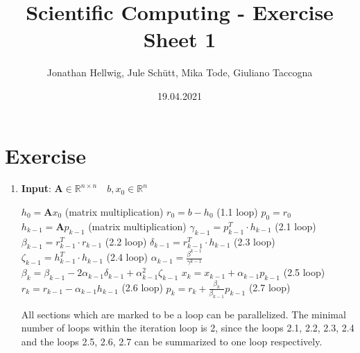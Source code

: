 \documentclass{article}
\title{Scientific Computing - Exercise Sheet 1}
\author{Jonathan Hellwig, Jule Schütt, Mika Tode, Giuliano Taccogna}
\date{19.04.2021}
\begin{document}
\maketitle

\section{Exercise}
\begin{enumerate}[label=(\alph*)]
  \item \textbf{Input}: $ \textbf{A} \in \mathbb{R}^{n\times n} \quad b, x_0\in \mathbb{R}^n$
    \begin{algorithmic}[1]
	\State $h_{0} = \textbf{A}x_{0}$ (matrix multiplication)
	\State $r_0 = b - h_0$ (1.1 loop)
	\State $p_0 = r_0$
	\State $h_{k-1} = \textbf{A}p_{k-1}$ (matrix multiplication)
	\State $\gamma_{k-1} = p^{T}_{k-1}\cdot h_{k-1}$ (2.1 loop)
	\State $\beta_{k-1} = r^{T}_{k-1}\cdot r_{k-1}$ (2.2 loop)
	\State $\delta_{k-1} = r^{T}_{k-1}\cdot h_{k-1}$ (2.3 loop)
	\State $\zeta_{k-1} = h^{T}_{k-1}\cdot h_{k-1}$ (2.4 loop)
	\State $\alpha_{k-1} = \frac{\beta^{k-1}}{\gamma^{k-1}}$
	\State $\beta_{k} = \beta_{k-1} - 2 \alpha_{k-1} \delta_{k-1} + \alpha_{k-1}^2\zeta_{k-1}$
	\State $x_k = x_{k-1} + \alpha_{k-1}p_{k-1}$ (2.5 loop)
	\State $r_k = r_{k-1} - \alpha_{k-1}h_{k-1}$ (2.6 loop)
	\State $p_k = r_{k} + \frac{\beta_k}{\beta_{k-1}}p_{k-1}$ (2.7 loop)
	\EndFor
    \end{algorithmic}
All sections which are marked to be a loop can be parallelized. The minimal number of loops within the iteration loop is 2, since the loops
2.1, 2.2, 2.3, 2.4 and the loops 2.5, 2.6, 2.7 can be summarized to one loop respectively.


\end{enumerate}
\end{document}
